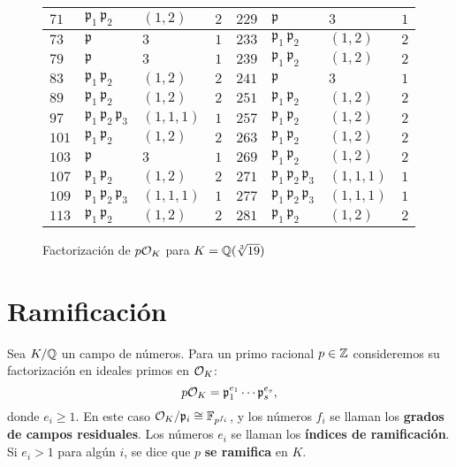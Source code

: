 \begin{figure}
\begin{center}
\begin{tabular}{x{1.25cm}x{1.25cm}x{1.25cm}x{1.25cm}x{1.25cm}x{1.25cm}x{1.25cm}x{1.25cm}}
\hline
$71$ & $\mathfrak{p}_1\,\mathfrak{p}_2$ & $(1,2)$ & $2$ & $229$ & $\mathfrak{p}$ & $3$ & $1$ \tabularnewline
\hline
$73$ & $\mathfrak{p}$ & $3$ & $1$ & $233$ & $\mathfrak{p}_1\,\mathfrak{p}_2$ & $(1,2)$ & $2$ \tabularnewline
\hline
$79$ & $\mathfrak{p}$ & $3$ & $1$ & $239$ & $\mathfrak{p}_1\,\mathfrak{p}_2$ & $(1,2)$ & $2$ \tabularnewline
\hline
$83$ & $\mathfrak{p}_1\,\mathfrak{p}_2$ & $(1,2)$ & $2$ & $241$ & $\mathfrak{p}$ & $3$ & $1$ \tabularnewline
\hline
$89$ & $\mathfrak{p}_1\,\mathfrak{p}_2$ & $(1,2)$ & $2$ & $251$ & $\mathfrak{p}_1\,\mathfrak{p}_2$ & $(1,2)$ & $2$ \tabularnewline
\hline
$97$ & $\mathfrak{p}_1\,\mathfrak{p}_2\,\mathfrak{p}_3$ & $(1,1,1)$ & $1$ & $257$ & $\mathfrak{p}_1\,\mathfrak{p}_2$ & $(1,2)$ & $2$ \tabularnewline
\hline
$101$ & $\mathfrak{p}_1\,\mathfrak{p}_2$ & $(1,2)$ & $2$ & $263$ & $\mathfrak{p}_1\,\mathfrak{p}_2$ & $(1,2)$ & $2$ \tabularnewline
\hline
$103$ & $\mathfrak{p}$ & $3$ & $1$ & $269$ & $\mathfrak{p}_1\,\mathfrak{p}_2$ & $(1,2)$ & $2$ \tabularnewline
\hline
$107$ & $\mathfrak{p}_1\,\mathfrak{p}_2$ & $(1,2)$ & $2$ & $271$ & $\mathfrak{p}_1\,\mathfrak{p}_2\,\mathfrak{p}_3$ & $(1,1,1)$ & $1$ \tabularnewline
\hline
$109$ & $\mathfrak{p}_1\,\mathfrak{p}_2\,\mathfrak{p}_3$ & $(1,1,1)$ & $1$ & $277$ & $\mathfrak{p}_1\,\mathfrak{p}_2\,\mathfrak{p}_3$ & $(1,1,1)$ & $1$ \tabularnewline
\hline
$113$ & $\mathfrak{p}_1\,\mathfrak{p}_2$ & $(1,2)$ & $2$ & $281$ & $\mathfrak{p}_1\,\mathfrak{p}_2$ & $(1,2)$ & $2$ \tabularnewline
\hline
\end{tabular}
\end{center}

\caption{Factorización de $p\mathcal{O}_K$ para $K = \mathbb{Q} (\sqrt[3]{19})$}
\end{figure}


\section{Ramificación}

\begin{definicion}
  Sea $K/\mathbb{Q}$ un campo de números. Para un primo racional $p\in\mathbb{Z}$ consideremos
  su factorización en ideales primos en $\mathcal{O}_K$:
  $$p\mathcal{O}_K = \mathfrak{p}_1^{e_1} \cdots \mathfrak{p}_s^{e_s},$$
  donde $e_i \ge 1$. En este caso
  $\mathcal{O}_K/\mathfrak{p}_i \cong \mathbb{F}_{p^{f_i}}$, y los números $f_i$ se llaman los
  \textbf{grados de campos residuales}. Los números $e_i$ se llaman
  los \textbf{índices de ramificación}. Si $e_i > 1$ para algún $i$,
  se dice que $p$ \textbf{se ramifica} en $K$.
\end{definicion}

